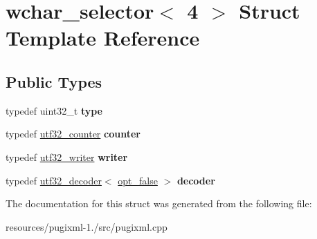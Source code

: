 \hypertarget{structwchar__selector_3_014_01_4}{\section{wchar\+\_\+selector$<$ 4 $>$ Struct Template Reference}
\label{structwchar__selector_3_014_01_4}
}
\subsection*{Public Types}
\begin{DoxyCompactItemize}
\item 
\hypertarget{structwchar__selector_3_014_01_4_af45ac603ab6fefec66e5c29044b4eed6}{typedef uint32\+\_\+t {\bfseries type}}\label{structwchar__selector_3_014_01_4_af45ac603ab6fefec66e5c29044b4eed6}

\item 
\hypertarget{structwchar__selector_3_014_01_4_a7d7c585ae0819660112b8c8683971b97}{typedef \hyperlink{structutf32__counter}{utf32\+\_\+counter} {\bfseries counter}}\label{structwchar__selector_3_014_01_4_a7d7c585ae0819660112b8c8683971b97}

\item 
\hypertarget{structwchar__selector_3_014_01_4_a48042e7fe51c4661397ae7afe3905243}{typedef \hyperlink{structutf32__writer}{utf32\+\_\+writer} {\bfseries writer}}\label{structwchar__selector_3_014_01_4_a48042e7fe51c4661397ae7afe3905243}

\item 
\hypertarget{structwchar__selector_3_014_01_4_add0a8302007d5e5def40457afc32ba78}{typedef \hyperlink{structutf32__decoder}{utf32\+\_\+decoder}$<$ \hyperlink{structopt__false}{opt\+\_\+false} $>$ {\bfseries decoder}}\label{structwchar__selector_3_014_01_4_add0a8302007d5e5def40457afc32ba78}

\end{DoxyCompactItemize}


The documentation for this struct was generated from the following file\+:\begin{DoxyCompactItemize}
\item 
resources/pugixml-\/1./src/pugixml.\+cpp\end{DoxyCompactItemize}
